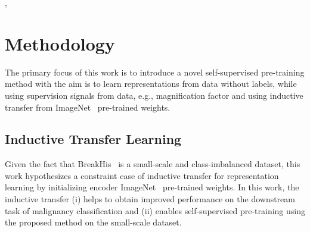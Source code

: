 \documentclass[conference]{IEEEtran}
\begin{document}
,  
\section{Methodology}
The primary focus of this work is to introduce a novel self-supervised pre-training method with the aim is to learn representations from data without labels, while using supervision signals from data, e.g., magnification factor and using inductive transfer from ImageNet~\cite{deng2009imagenet} pre-trained weights.








\subsection{Inductive Transfer Learning}






Given the fact that BreakHis~\cite{spanhol2016dataset} is a small-scale and class-imbalanced dataset, this work hypothesizes a constraint case of inductive transfer for representation learning by initializing encoder ImageNet~\cite{deng2009imagenet} pre-trained weights.
In this work, the inductive transfer (i) helps to obtain improved performance on the downstream task of malignancy classification and (ii) enables self-supervised pre-training using the proposed method on the small-scale dataset.



  
\end{document}
